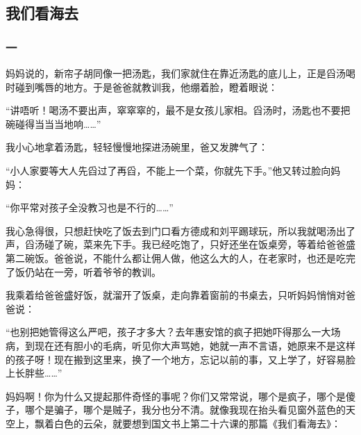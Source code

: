 \subsection{我们看海去}




\subsubsection*{一}

\par 妈妈说的，新帘子胡同像一把汤匙，我们家就住在靠近汤匙的底儿上，正是舀汤喝时碰到嘴唇的地方。于是爸爸就教训我，他绷着脸，瞪着眼说：
\par “讲唔听！喝汤不要出声，窣窣窣的，最不是女孩儿家相。舀汤时，汤匙也不要把碗碰得当当当地响……”
\par 我小心地拿着汤匙，轻轻慢慢地探进汤碗里，爸又发脾气了：
\par “小人家要等大人先舀过了再舀，不能上一个菜，你就先下手。”他又转过脸向妈妈：
\par “你平常对孩子全没教习也是不行的……”
\par 我心急得很，只想赶快吃了饭去到门口看方德成和刘平踢球玩，所以我就喝汤出了声，舀汤碰了碗，菜来先下手。我已经吃饱了，只好还坐在饭桌旁，等着给爸爸盛第二碗饭。爸爸说，不能什么都让佣人做，他这么大的人，在老家时，也还是吃完了饭仍站在一旁，听着爷爷的教训。
\par 我乘着给爸爸盛好饭，就溜开了饭桌，走向靠着窗前的书桌去，只听妈妈悄悄对爸爸说：
\par “也别把她管得这么严吧，孩子才多大？去年惠安馆的疯子把她吓得那么一大场病，到现在还有胆小的毛病，听见你大声骂她，她就一声不言语，她原来不是这样的孩子呀！现在搬到这里来，换了一个地方，忘记以前的事，又上学了，好容易脸上长胖些……”
\par 妈妈啊！你为什么又提起那件奇怪的事呢？你们又常常说，哪个是疯子，哪个是傻子，哪个是骗子，哪个是贼子，我分也分不清。就像我现在抬头看见窗外蓝色的天空上，飘着白色的云朵，就要想到国文书上第二十六课的那篇《我们看海去》：
